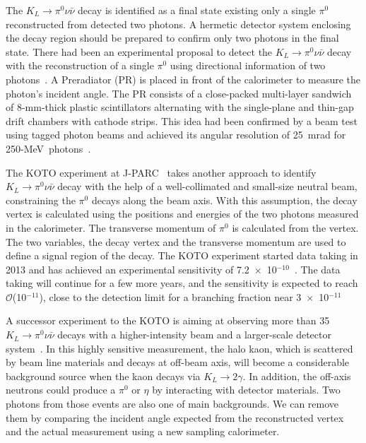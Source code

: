 \documentclass[12pt,times,draftclsnofoot,a4paper]{elsarticle}
\begin{document}
The $K_{L} \rightarrow \pi^{0}\nu\bar{\nu}$ decay is identified as a final state existing only a single $\pi^{0}$ reconstructed from detected two photons. A hermetic detector system enclosing the decay region should be prepared to confirm only two photons in the final state. There had been an experimental proposal to detect the $K_{L} \rightarrow \pi^{0}\nu\bar{\nu}$ decay with the reconstruction of a single $\pi^{0}$ using directional information of two photons~\cite{KOPIO}. A Preradiator (PR) is placed in front of the calorimeter to measure the photon's incident angle. The PR consists of a close-packed multi-layer sandwich of 8-mm-thick plastic scintillators alternating with the single-plane and thin-gap drift chambers with cathode strips. This idea had been confirmed by a beam test using tagged photon beams and achieved its angular resolution of 25~mrad for 250-MeV~photons~\cite{KOPIOcdr}.

The KOTO experiment at J-PARC~\cite{KOTOexp} takes another approach to identify $K_{L} \rightarrow \pi^{0}\nu\bar{\nu}$ decay with the help of a well-collimated and small-size neutral beam, constraining the $\pi^{0}$ decays along the beam axis. With this assumption, the decay vertex is calculated using the positions and energies of the two photons measured in the calorimeter. The transverse momentum of $\pi^{0}$ is calculated from the vertex. The two variables, the decay vertex and the transverse momentum are used to define a signal region of the decay. The KOTO experiment started data taking in 2013 and has achieved an experimental sensitivity of 7.2~$\times$~10$^{-10}$~\cite{KOTOexp}. The data taking will continue for a few more years, and the sensitivity is expected to reach $\mathcal{O}$(10$^{-11}$), close to the detection limit for a branching fraction near 3~$\times$~10$^{-11}$ 

A successor experiment to the KOTO is aiming at observing more than 35 $K_{L} \rightarrow \pi^{0}\nu\bar{\nu}$ decays with a higher-intensity beam and a larger-scale detector system~\cite{KOTO2}. In this highly sensitive measurement, the halo kaon, which is scattered by beam line materials and decays at off-beam axis, will become a considerable background source when the kaon decays via $K_{L} \rightarrow 2\gamma$. In addition, the off-axis neutrons could produce a $\pi^{0}$ or $\eta$ by interacting with detector materials. Two photons from those events are also one of main backgrounds. We can remove them by comparing the incident angle expected from the reconstructed vertex and the actual measurement using a new sampling calorimeter.
\end{document}
